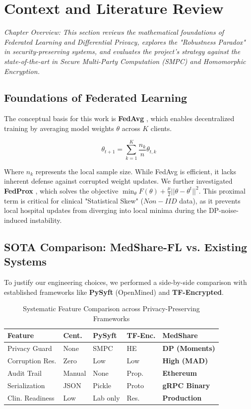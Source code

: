 \documentclass[10pt, a4paper, twocolumn]{article}
\begin{document}
\section{Context and Literature Review}

\textit{Chapter Overview: This section reviews the mathematical foundations of Federated Learning and Differential Privacy, explores the "Robustness Paradox" in security-preserving systems, and evaluates the project's strategy against the state-of-the-art in Secure Multi-Party Computation (SMPC) and Homomorphic Encryption.}

\subsection{Foundations of Federated Learning}
The conceptual basis for this work is \textbf{FedAvg} \cite{mcmahan2017}, which enables decentralized training by averaging model weights $\theta$ across $K$ clients.

\begin{equation}
    \theta_{t+1} = \sum_{k=1}^K \frac{n_k}{n} \theta_{t,k}
\end{equation}

Where $n_k$ represents the local sample size. While FedAvg is efficient, it lacks inherent defense against corrupted weight updates. We further investigated \textbf{FedProx} \cite{li2020}, which solves the objective $\min_{\theta} F(\theta) + \frac{\mu}{2} ||\theta - \theta^t||^2$. This proximal term is critical for clinical "Statistical Skew" ($Non-IID$ data), as it prevents local hospital updates from diverging into local minima during the DP-noise-induced instability.

\subsection{SOTA Comparison: MedShare-FL vs. Existing Systems}
To justify our engineering choices, we performed a side-by-side comparison with established frameworks like \textbf{PySyft} (OpenMined) and \textbf{TF-Encrypted}.

\begin{table}[hbt!]
\centering
\scriptsize
\begin{tabular}{lp{1.3cm}p{1.3cm}p{1.3cm}p{1.3cm}}
\toprule
\textbf{Feature} & \textbf{Cent.} & \textbf{PySyft} & \textbf{TF-Enc.} & \textbf{MedShare} \\
\midrule
Privacy Guard & None & SMPC & HE & \textbf{DP (Moments)} \\
Corruption Res. & Zero & Low & Low & \textbf{High (MAD)} \\
Audit Trail & Manual & None & Prop. & \textbf{Ethereum} \\
Serialization & JSON & Pickle & Proto & \textbf{gRPC Binary} \\
Clin. Readiness & Low & Lab only & Res. & \textbf{Production} \\
\bottomrule
\end{tabular}
\caption{Systematic Feature Comparison across Privacy-Preserving Frameworks}
\end{table}
\end{document}
